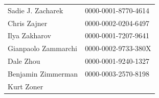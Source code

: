 \documentclass[fleqn,10pt,inline]{wlscirep}
\begin{document}
\begin{appendixbox}
\begin{longtable}{ll}
         Sadie J. Zacharek & 0000-0001-8770-4614 \\
              Chris Zajner & 0000-0002-0204-6497 \\
             Ilya Zakharov & 0000-0001-7207-9641 \\
       Gianpaolo Zammarchi & 0000-0002-9733-380X \\
                 Dale Zhou & 0000-0001-9240-1327 \\
        Benjamin Zimmerman & 0000-0003-2570-8198 \\
                Kurt Zoner &                     \\
\end{longtable}

\end{appendixbox}
\end{document}
